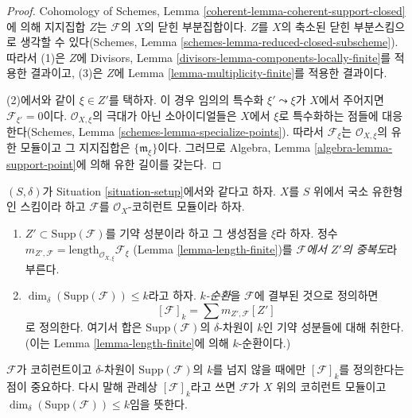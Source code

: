 \begin{proof}
Cohomology of Schemes, Lemma
\ref{coherent-lemma-coherent-support-closed}에 의해 지지집합 $Z$는
$\mathcal{F}$의 $X$의 닫힌 부분집합이다. $Z$를 $X$의 축소된 닫힌
부분스킴으로 생각할 수 있다(Schemes, Lemma
\ref{schemes-lemma-reduced-closed-subscheme}). 따라서 (1)은 $Z$에
Divisors, Lemma \ref{divisors-lemma-components-locally-finite}를 적용한
결과이고, (3)은 $Z$에 Lemma \ref{lemma-multiplicity-finite}를 적용한
결과이다.

\medskip\noindent
(2)에서와 같이 $\xi \in Z'$를 택하자. 이 경우 임의의 특수화
$\xi' \leadsto \xi$가 $X$에서 주어지면 $\mathcal{F}_{\xi'} = 0$이다.
$\mathcal{O}_{X, \xi}$의 극대가 아닌 소아이디얼들은 $X$에서 $\xi$로
특수화하는 점들에 대응한다(Schemes, Lemma
\ref{schemes-lemma-specialize-points}). 따라서 $\mathcal{F}_\xi$는
$\mathcal{O}_{X, \xi}$의 유한 모듈이고 그 지지집합은
$\{\mathfrak m_\xi\}$이다. 그러므로 Algebra, Lemma
\ref{algebra-lemma-support-point}에 의해 유한 길이를 갖는다.
\end{proof}

\begin{definition}
\label{definition-cycle-associated-to-coherent-sheaf}
$(S, \delta)$가 Situation \ref{situation-setup}에서와 같다고 하자.
$X$를 $S$ 위에서 국소 유한형인 스킴이라 하고
$\mathcal{F}$를 $\mathcal{O}_X$-코히런트 모듈이라 하자.
\begin{enumerate}
\item $Z' \subset \text{Supp}(\mathcal{F})$를 기약 성분이라 하고 그
생성점을 $\xi$라 하자. 정수
$m_{Z', \mathcal{F}} = \text{length}_{\mathcal{O}_{X, \xi}} \mathcal{F}_\xi$
(Lemma \ref{lemma-length-finite})를 {\it $\mathcal{F}$에서 $Z'$의 중복도}라
부른다.
\item $\dim_\delta(\text{Supp}(\mathcal{F})) \leq k$라고 하자.
{\it $k$-순환}을 $\mathcal{F}$에 결부된 것으로 정의하면
$$
[\mathcal{F}]_k
=
\sum m_{Z', \mathcal{F}}[Z']
$$
로 정의한다. 여기서 합은 $\text{Supp}(\mathcal{F})$의
$\delta$-차원이 $k$인 기약 성분들에 대해 취한다. (이는 Lemma
\ref{lemma-length-finite}에 의해 $k$-순환이다.)
\end{enumerate}
\end{definition}

\noindent
$\mathcal{F}$가 코히런트이고 $\delta$-차원이
$\text{Supp}(\mathcal{F})$의 $k$를 넘지 않을 때에만
$[\mathcal{F}]_k$를 정의한다는 점이 중요하다. 다시 말해 관례상
$[\mathcal{F}]_k$라고 쓰면 $\mathcal{F}$가 $X$ 위의 코히런트 모듈이고
$\dim_\delta(\text{Supp}(\mathcal{F})) \leq k$임을 뜻한다.

